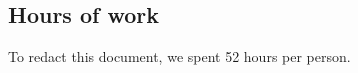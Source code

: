  \begin{appendices}

\chapter{Hours of work}
To redact this document, we spent 52 hours per person.

\end{appendices}